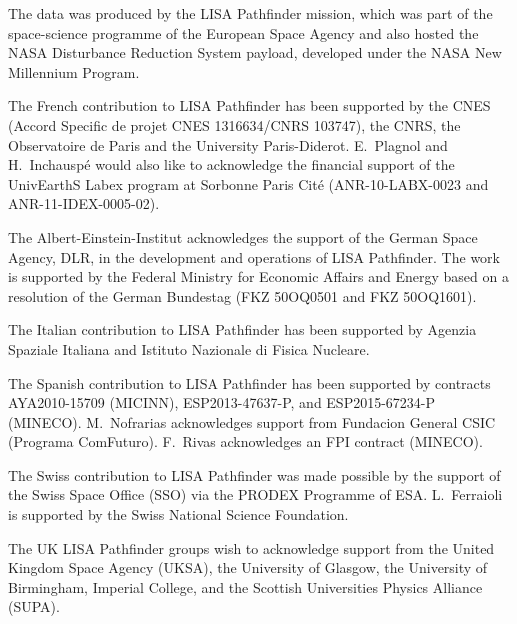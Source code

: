 \documentclass[twocolumn, trackchanges]{aastex61}
\begin{document}
The data was produced by the LISA Pathfinder mission, which was part of the
space-science programme of the European Space Agency and also hosted the NASA Disturbance Reduction System payload, developed under the NASA New Millennium Program. 

The French contribution to LISA Pathfinder has been supported by the CNES (Accord Specific de projet
CNES 1316634/CNRS 103747), the CNRS, the Observatoire de Paris and the University
Paris-Diderot. E.~Plagnol and H.~Inchausp\'{e} would also like to acknowledge the
financial support of the UnivEarthS Labex program at Sorbonne Paris Cit\'{e}
(ANR-10-LABX-0023 and ANR-11-IDEX-0005-02).

The Albert-Einstein-Institut acknowledges the support of the German Space Agency,
DLR, in the development and operations of LISA Pathfinder. The work is supported by the Federal Ministry for Economic Affairs and Energy
based on a resolution of the German Bundestag (FKZ 50OQ0501 and FKZ 50OQ1601). 

The Italian contribution to LISA Pathfinder has been supported  by Agenzia Spaziale Italiana and Istituto
Nazionale di Fisica Nucleare.

The Spanish contribution to LISA Pathfinder has been supported by contracts AYA2010-15709 (MICINN),
ESP2013-47637-P, and ESP2015-67234-P (MINECO). M.~Nofrarias acknowledges support from
Fundacion General CSIC (Programa ComFuturo). F.~Rivas acknowledges an FPI contract
(MINECO).

The Swiss contribution to LISA Pathfinder was made possible by the support of the Swiss Space Office (SSO)
via the PRODEX Programme of ESA. L.~Ferraioli is supported by the Swiss National
Science Foundation.

The UK LISA Pathfinder groups wish to acknowledge support from the United Kingdom Space Agency
(UKSA), the University of Glasgow, the University of Birmingham, Imperial College,
and the Scottish Universities Physics Alliance (SUPA).

%
\end{document}
